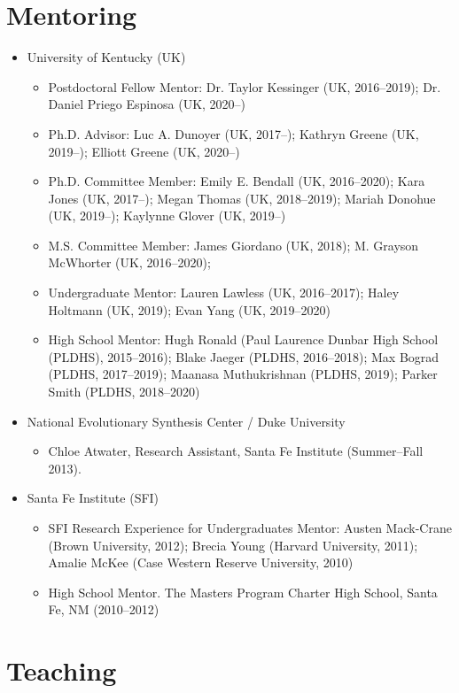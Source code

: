 \documentclass[11pt]{article}
\begin{document}
  \section{Mentoring}

  \begin{itemize}
  \item University of Kentucky (UK)
    \begin{itemize}
    \item Postdoctoral Fellow Mentor: Dr. Taylor Kessinger (UK, 2016--2019); Dr. Daniel Priego Espinosa (UK, 2020--)
    \item Ph.D. Advisor: Luc A. Dunoyer (UK, 2017--); Kathryn Greene (UK, 2019--); Elliott Greene (UK, 2020--)
    \item Ph.D. Committee Member: Emily E. Bendall (UK, 2016--2020); Kara Jones (UK, 2017--); Megan Thomas (UK, 2018--2019); Mariah Donohue (UK, 2019--); Kaylynne Glover (UK, 2019--)
     \item M.S. Committee Member: James Giordano (UK, 2018); M. Grayson McWhorter (UK, 2016--2020); 
    \item Undergraduate Mentor: Lauren Lawless (UK, 2016--2017); Haley Holtmann (UK, 2019); Evan Yang (UK, 2019--2020)
    \item High School Mentor: Hugh Ronald (Paul Laurence Dunbar High School (PLDHS), 2015--2016); Blake Jaeger (PLDHS, 2016--2018); Max Bograd (PLDHS, 2017--2019); Maanasa Muthukrishnan (PLDHS, 2019); Parker Smith (PLDHS, 2018--2020)
    \end{itemize}
  \item National Evolutionary Synthesis Center / Duke University
    \begin{itemize}
    \item Chloe Atwater, Research Assistant, Santa Fe Institute (Summer--Fall 2013).
    \end{itemize}
  \item Santa Fe Institute (SFI)
    \begin{itemize}
    \item SFI Research Experience for Undergraduates Mentor: Austen Mack-Crane (Brown University, 2012); Brecia Young (Harvard University, 2011); 
      Amalie McKee (Case Western Reserve University, 2010)
    \item High School Mentor. The Masters Program Charter High School, Santa Fe, NM (2010--2012)
    \end{itemize}
  \end{itemize}

  \section{Teaching}
  
\end{document}
